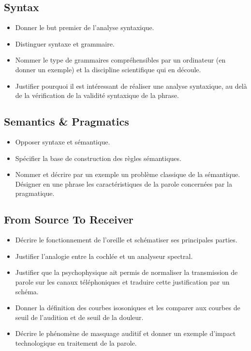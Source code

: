 \documentclass[letterpaper, 12pt]{article}
\begin{document}
	\subsection{Syntax}
	\begin{itemize}
		\setlength{\itemsep}{0pt}		
		\setlength{\parskip}{0pt}		
		\setlength{\parsep}{0pt}	
		\item Donner le but premier de l'analyse syntaxique.
    	\item Distinguer syntaxe et grammaire.
    	\item Nommer le type de grammaires compréhensibles par un ordinateur (en donner un exemple) et la 
    		discipline scientifique qui en découle.
    	\item Justifier pourquoi il est intéressant de réaliser une analyse syntaxique, au delà de la 
    		vérification de la validité syntaxique de la phrase.
	\end{itemize}
	\subsection{Semantics \& Pragmatics}
	\begin{itemize}
		\setlength{\itemsep}{0pt}		
		\setlength{\parskip}{0pt}		
		\setlength{\parsep}{0pt}	
		\item Opposer syntaxe et sémantique.
    	\item Spécifier la base de construction des règles sémantiques.
    	\item Nommer et décrire par un exemple un problème classique de la sémantique. Désigner en une phrase les 
    		caractéristiques de la parole concernées par la pragmatique.
	\end{itemize}
	\subsection{From Source To Receiver}
	\begin{itemize}
		\setlength{\itemsep}{0pt}		
		\setlength{\parskip}{0pt}		
		\setlength{\parsep}{0pt}	
		\item Décrire le fonctionnement de l'oreille et schématiser ses principales parties.
    	\item Justifier l'analogie entre la cochlée et un analyseur spectral.
    	\item Justifier que la psychophysique ait permis de normaliser la transmission de parole sur les canaux 
    		téléphoniques et traduire cette justification par un schéma.
    	\item Donner la définition des courbes isosoniques et les comparer aux courbes de seuil de l'audition et de 
    		seuil de la douleur.
    	\item Décrire le phénomène de masquage auditif et donner un exemple d'impact technologique en traitement de la 
    		parole.
	\end{itemize}
\end{document}
